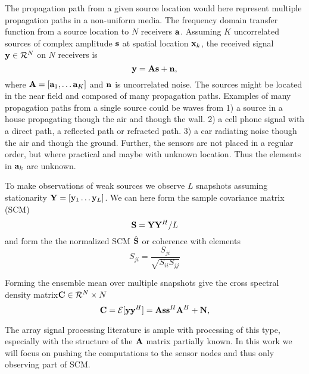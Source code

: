 The propagation path from a given source location would here represent multiple propagation paths in a non-uniform media. The frequency domain transfer function from a source location to $N$ receivers ${\bf a}$. Assuming $K$ uncorrelated sources of complex amplitude ${\bf s}$ at spatial location ${\bf x}_k$, the received signal ${\bf y}\in {\cal R}^N$ on $N$ receivers is 
\begin{equation}
{\bf y}={\bf A}{\bf s}+{\bf n},
\end{equation}
where ${\bf A}=[{\bf a}_1, \ldots {\bf a}_K ]$  and $\bf n$ is uncorrelated noise. 
The sources might be located in the near field and  composed of many propagation paths. Examples of many propagation paths from a single source could be waves from  
1) a source in a house propagating though the air and though the wall.
2) a cell phone signal with a direct path, a reflected path or refracted path.
3) a car radiating noise though the air and though the ground.
Further, the sensors are not placed in a regular order, but where practical and maybe with unknown location. Thus the elements in ${\bf a}_k$ are unknown.


To make observations of weak sources we observe $L$ snapshots  assuming  stationarity ${\bf Y}=[{\bf y}_1 \ldots {\bf y}_L]$.
We can here form the sample covariance matrix (SCM)
\begin{equation}
{\bf S} ={\bf Y}{\bf Y}^H/L
\end{equation}
and form the the normalized SCM $\hat{\bf S}$ or coherence with elements
\begin{equation}
{ S}_{ji} =\frac{{ S}_{ji}}{\sqrt{ { S}_{ii}{ S}_{jj}}}
\end{equation}


Forming the ensemble mean over multiple snapshots give the cross spectral density matrix${\bf C}\in {\cal R}^N\times N$
\begin{equation}
{\bf C}={\cal E}[{\bf y} {\bf y}^H]= {\bf A}{\bf s}{\bf s}^H{\bf A}^H+{\bf N},
\end{equation}

The array signal processing literature is ample with processing of this type, especially with the structure of the $\bf A$ matrix partially known. In this work we will focus on pushing the computations to the sensor nodes and thus only observing part of SCM.

